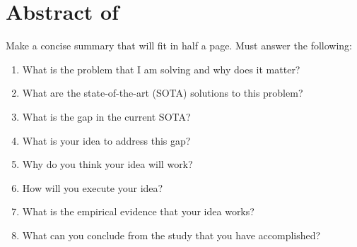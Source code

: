 \chapter{Abstract of \Type}

Make a concise summary that will fit in half a page. Must answer the following:
\begin{enumerate}
    \item What is the problem that I am solving and why does it matter?
    \item What are the state-of-the-art (SOTA) solutions to this problem?
    \item What is the gap in the current SOTA?
    \item What is your idea to address this gap?
    \item Why do you think your idea will work?
    \item How will you execute your idea?
    \item What is the empirical evidence that your idea works?
    \item What can you conclude from the study that you have accomplished?
\end{enumerate}
